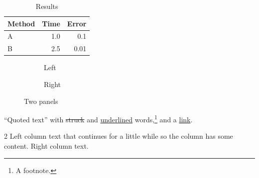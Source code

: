 \documentclass{amsart}
\begin{document}
\begin{table}[H]
  \centering
  \caption{Results}
  \begin{tabular}{lrr}
    \toprule
    Method & Time & Error \\
    \midrule
    A & 1.0 & 0.1 \\
    B & 2.5 & 0.01 \\
    \bottomrule
  \end{tabular}
\end{table}
\begin{figure}[H]
  \centering
  \begin{subfigure}{0.45\textwidth}\centering
    \caption{Left}
  \end{subfigure}\hfill
  \begin{subfigure}{0.45\textwidth}\centering
    \caption{Right}
  \end{subfigure}
  \caption{Two panels}
\end{figure}
\enquote{Quoted text} with \sout{struck} and \uline{underlined} words,\footnote{A footnote.} and a \href{https://example.org}{link}.
\begin{multicols}{2}
  Left column text that continues for a little while so the column has some content.
  \columnbreak
  Right column text.
\end{multicols}
\end{document}
